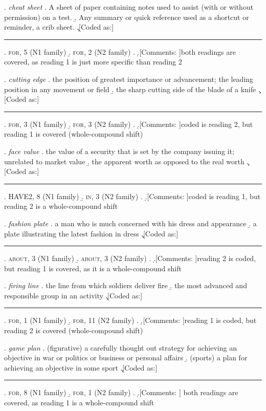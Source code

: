 \ex. \emph{cheat sheet}
\a. A sheet of paper containing notes used to assist (with or without permission) on a test.
\b. Any summary or quick reference used as a shortcut or reminder, a crib sheet.
\c.[Coded as:] {\rule{4cm}{0cm}}
\a. \textsc{for}, 5 (N1 family)
\b. \textsc{for}, 2 (N2 family)
\z.
\d.[Comments: ]both readings are covered, as reading 1 is just more specific than reading 2

\ex. \emph{cutting edge}
\a. the position of greatest importance or advancement; the leading position in any movement or field
\b. the sharp cutting side of the blade of a knife
\c.[Coded as:] {\rule{4cm}{0cm}}
\a. \textsc{for}, 3 (N1 family)
\b. \textsc{for}, 3 (N2 family)
\z.
\d.[Comments: ]coded is reading 2, but reading 1 is covered (whole-compound shift)

\ex. \emph{face value}
\a. the value of a security that is set by the company issuing it; unrelated to market value 
\b. the apparent worth as opposed to the real worth
\c.[Coded as:] {\rule{4cm}{0cm}}
\a. HAVE2, 8 (N1 family)
\b. \textsc{in}, 3 (N2 family)
\z.
\d.[Comments: ]coded is reading 1, but reading 2 is a whole-compound shift


\ex. \emph{fashion plate}
\a. a man who is much concerned with his dress and appearance
\b. a plate illustrating the latest fashion in dress
\c.[Coded as:] {\rule{4cm}{0cm}}
\a. \textsc{about}, 3 (N1 family)
\b. \textsc{about}, 3 (N2 family)
\z.
\d.[Comments: ]reading 2 is coded, but reading 1 is covered, as it is a whole-compound shift




\ex. \emph{firing line}
\a. the line from which soldiers deliver fire
\b. the most advanced and responsible group in an activity
\c.[Coded as:] {\rule{4cm}{0cm}}
\a. \textsc{for}, 1 (N1 family)
\b. \textsc{for}, 11 (N2 family)
\z.
\d.[Comments: ]reading 1 is coded, but reading 2 is covered (whole-compound shift) 



\pagebreak[4]
\ex. \emph{game plan}
\a. (figurative) a carefully thought out strategy for achieving an objective in war or politics or business or personal affairs
\b. (sports) a plan for achieving an objective in some sport
\c.[Coded as:] {\rule{4cm}{0cm}}
\a. \textsc{for}, 8 (N1 family)
\b. \textsc{for}, 1 (N2 family)
\z.
\d.[Comments: ] both readings are covered, as reading 1 is a whole-compound shift



